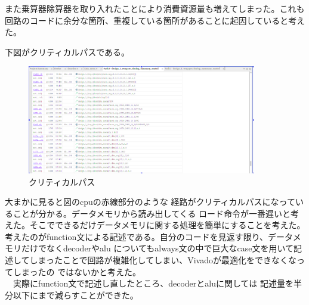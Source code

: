 \documentclass[12pt]{jreport}
\begin{document}
  また乗算器除算器を取り入れたことにより消費資源量も増えてしまった。これも
  回路のコードに余分な箇所、重複している箇所があることに起因していると考えた。

  下図がクリティカルパスである。
  \begin{figure}[H]
    \centering
    \includegraphics[width=10cm]{picture/cri.png}
    \caption{クリティカルパス}
  \end{figure}

  大まかに見ると図のcpuの赤線部分のような
  経路がクリティカルパスになっていることが分かる。データメモリから読み出してくる
  ロード命令が一番遅いと考えた。そこでできるだけデータメモリに関する処理を簡単にすることを考えた。
  考えたのがfunction文による記述である。自分のコードを見返す限り、データメモリだけでなくdecoderやalu
  についてもalways文の中で巨大なcase文を用いて記述してしまったことで回路が複雑化してしまい、Vivadoが最適化をできなくなってしまったの
  ではないかと考えた。\\
  　実際にfunction文で記述し直したところ、decoderとaluに関しては
  記述量を半分以下にまで減らすことができた。\\
  
\end{document}
